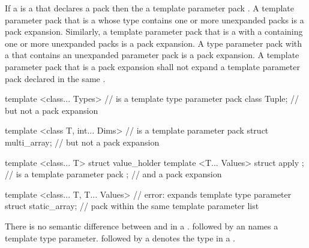 \documentclass{wg21}
\begin{document}
\pnum
If a  is a
 that declares a
pack 
then the 
 a template parameter pack .
A template parameter pack that is a  whose type
contains one or more unexpanded packs is a pack expansion. Similarly,
a template parameter pack that is a  with a
 containing one or more unexpanded
packs is a pack expansion.
A type parameter pack with a  that
contains an unexpanded parameter pack is a pack expansion.
A template parameter pack that is a pack
expansion shall not expand a template parameter pack declared in the same
.
\begin{example}
\begin{codeblock}
    template <class... Types>                       //  is a template type parameter pack
    class Tuple;                                 // but not a pack expansion

    template <class T, int... Dims>                 //  is a  template parameter pack
    struct multi_array;                          // but not a pack expansion

    template <class... T>
    struct value_holder {
        template <T... Values> struct apply { };    //  is a  template parameter pack
    };                                            // and a pack expansion

    template <class... T, T... Values>              // error:  expands template type parameter
    struct static_array;                          // pack  within the same template parameter list
\end{codeblock}
\end{example}

\pnum
There is no semantic difference between
and
in a
.
followed by an
names a template type parameter.
followed by a
denotes the type in a  .
\end{document}
